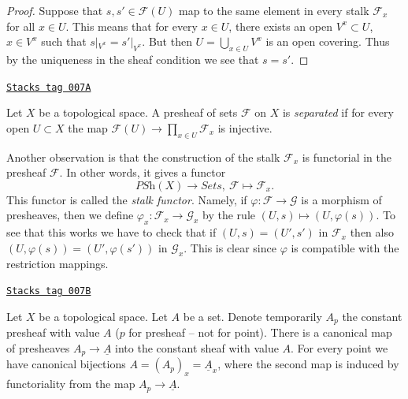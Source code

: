 \begin{proof}
Suppose that $s, s' \in \mathcal{F}(U)$ map to the same element
in every stalk $\mathcal{F}_x$ for all $x \in U$. This means that
for every $x \in U$, there exists an open $V^x \subset U$,
$x \in V^x$ such that $s|_{V^x} = s'|_{V^x}$. But then
$U = \bigcup_{x \in U} V^x$ is an open covering. Thus by the
uniqueness in the sheaf condition we see that $s = s'$.
\end{proof}

\begin{definition}[Separated]
\label{sheaves-definition-separated}
\href{https://stacks.math.columbia.edu/tag/007A}{\texttt{Stacks tag 007A}}

Let $X$ be a topological space.
A presheaf of sets $\mathcal{F}$ on $X$ is {\it separated}
if for every open $U \subset X$ the map
$\mathcal{F}(U) \to \prod_{x \in U} \mathcal{F}_x$ is
injective.
\end{definition}

Another observation is that the construction of the stalk
$\mathcal{F}_x$ is functorial in the presheaf $\mathcal{F}$.
In other words, it gives a functor
$$
\textit{PSh}(X) \longrightarrow \textit{Sets},
\ \mathcal{F} \longmapsto \mathcal{F}_x.
$$
This functor is called the {\it stalk functor}.
Namely, if $\varphi : \mathcal{F} \to \mathcal{G}$ is
a morphism of presheaves, then we define
$\varphi_x : \mathcal{F}_x \to \mathcal{G}_x$
by the rule $(U, s) \mapsto (U, \varphi(s))$.
To see that this works we have to check that
if $(U, s) = (U', s')$ in $\mathcal{F}_x$ then also
$(U, \varphi(s)) = (U', \varphi(s'))$ in $\mathcal{G}_x$.
This is clear since $\varphi$ is compatible with the
restriction mappings.

\begin{example}
\label{sheaves-example-stalk-constant-presheaf}
\href{https://stacks.math.columbia.edu/tag/007B}{\texttt{Stacks tag 007B}}

Let $X$ be a topological space. Let $A$ be a set.
Denote temporarily $A_p$ the constant presheaf
with value $A$ ($p$ for presheaf -- not for point).
There is a canonical map of presheaves
$A_p \to \underline{A}$ into the constant sheaf with
value $A$. For every point we have canonical
bijections $A = (A_p)_x = \underline{A}_x$, where
the second map is induced by functoriality from
the map $A_p \to \underline{A}$.
\end{example}


